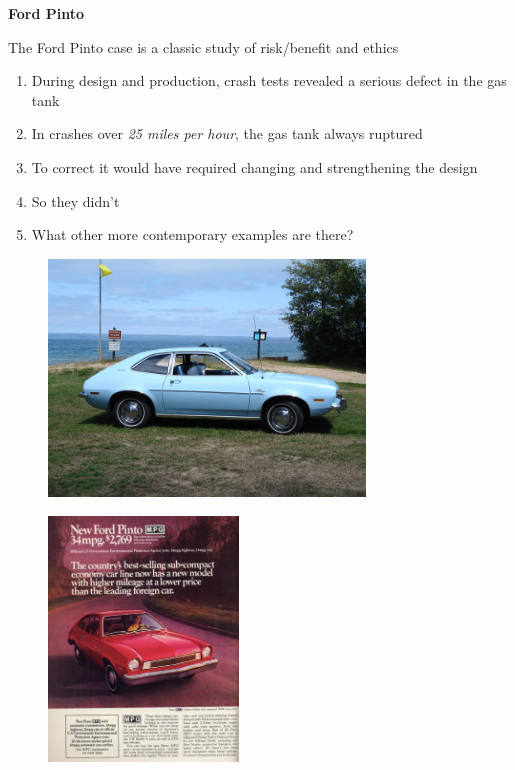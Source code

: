 \documentclass[aspectratio=1610,pdftex,dvipsnames,compress,xcolor={dvipsnames}]{beamer}
\begin{document}
\begin{frame}[plain]{}
    \centering\LARGE\textbf{Ford Pinto}
\end{frame}


\addtocounter{framenumber}{-1}
\begin{frame}{The Ford Pinto case is a classic study of risk/benefit and ethics}
    \begin{enumerate}[series=outerlist,topsep=0pt,itemsep=21pt,leftmargin=*,label=(\arabic*)]
        \item[]During design and production, crash tests revealed a serious defect in the gas tank
        \item[]In crashes over \textit{25 miles per hour}, the gas tank always ruptured
        \item[]To correct it would have required changing and strengthening the design
        \item[]So they didn’t
        \item[]What other more contemporary examples are there?
    \end{enumerate}
\end{frame}


\begin{frame}{}
    \begin{figure}
        \centering
        \includegraphics[width=0.75\textwidth]{blue.pinto.jpg}
    \end{figure}
\end{frame}


\begin{frame}{}
    \begin{figure}
        \centering
        \includegraphics[width=0.45\textwidth]{pinto.ad.jpg}
    \end{figure}
\end{frame}
\end{document}
